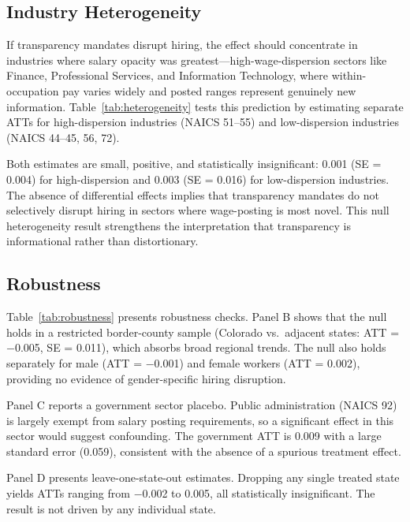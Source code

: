 \documentclass[12pt]{article}
\begin{document}
\subsection{Industry Heterogeneity}



If transparency mandates disrupt hiring, the effect should concentrate in industries where salary opacity was greatest---high-wage-dispersion sectors like Finance, Professional Services, and Information Technology, where within-occupation pay varies widely and posted ranges represent genuinely new information. Table~\ref{tab:heterogeneity} tests this prediction by estimating separate ATTs for high-dispersion industries (NAICS 51--55) and low-dispersion industries (NAICS 44--45, 56, 72).

Both estimates are small, positive, and statistically insignificant: 0.001 (SE = 0.004) for high-dispersion and 0.003 (SE = 0.016) for low-dispersion industries. The absence of differential effects implies that transparency mandates do not selectively disrupt hiring in sectors where wage-posting is most novel. This null heterogeneity result strengthens the interpretation that transparency is informational rather than distortionary.

\subsection{Robustness}



Table~\ref{tab:robustness} presents robustness checks. Panel B shows that the null holds in a restricted border-county sample (Colorado vs.\ adjacent states: ATT = $-$0.005, SE = 0.011), which absorbs broad regional trends. The null also holds separately for male (ATT = $-$0.001) and female workers (ATT = 0.002), providing no evidence of gender-specific hiring disruption.

Panel C reports a government sector placebo. Public administration (NAICS 92) is largely exempt from salary posting requirements, so a significant effect in this sector would suggest confounding. The government ATT is 0.009 with a large standard error (0.059), consistent with the absence of a spurious treatment effect.

Panel D presents leave-one-state-out estimates. Dropping any single treated state yields ATTs ranging from $-$0.002 to 0.005, all statistically insignificant. The result is not driven by any individual state.
\end{document}

